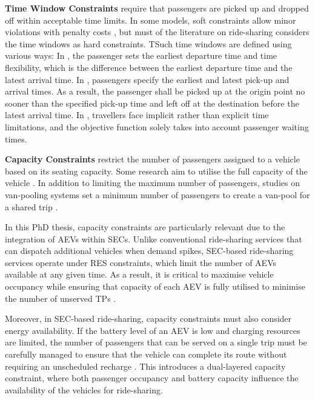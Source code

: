 \textbf{Time Window Constraints} require that passengers are picked up and dropped off within acceptable time limits. In some models, soft constraints allow minor violations with penalty costs \cite{agatz2011dynamic7, naoum2015stochastic133}, but must of the literature on ride-sharing considers the time windows as hard constraints. TSuch time windows are defined using various ways: In \cite{agatz2011dynamic7}, the passenger sets the earliest departure time and time flexibility, which is the difference between the earliest departure time and the latest arrival time. In \cite{naoum2015stochastic133, wang2018stable173, herbawi2012ridematching80, agatz2011dynamic7}, passengers specify the earliest and latest pick-up and arrival times. As a result, the passenger shall be picked up at the origin point no sooner than the specified pick-up time and left off at the destination before the latest arrival time. In \cite{linares2016simulation87}, travellers face implicit rather than explicit time limitations, and the objective function solely takes into account passenger waiting times.

\textbf{Capacity Constraints} restrict the number of passengers assigned to a vehicle based on its seating capacity. Some research aim to utilise the full capacity of the vehicle \cite{goel2017optimal68, dorey2014ridesharing53}. In addition to limiting the maximum number of passengers, studies on van-pooling systems set a minimum number of passengers to create a van-pool for a shared trip \cite{kaan2013vanpool93}. 

In this PhD thesis, capacity constraints are particularly relevant due to the integration of AEVs within SECs. Unlike conventional ride-sharing services that can dispatch additional vehicles when demand spikes, SEC-based ride-sharing services operate under RES constraints, which limit the number of AEVs available at any given time. As a result, it is critical to maximise vehicle occupancy while ensuring that capacity of each AEV is fully utilised to minimise the number of unserved TPs \cite{stiglic2018enhancing163, liu2020optimizing}.

Moreover, in SEC-based ride-sharing, capacity constraints must also consider energy availability. If the battery level of an AEV is low and charging resources are limited, the number of passengers that can be served on a single trip must be carefully managed to ensure that the vehicle can complete its route without requiring an unscheduled recharge \cite{hu2020electric}. This introduces a dual-layered capacity constraint, where both passenger occupancy and battery capacity influence the availability of the vehicles for ride-sharing.

